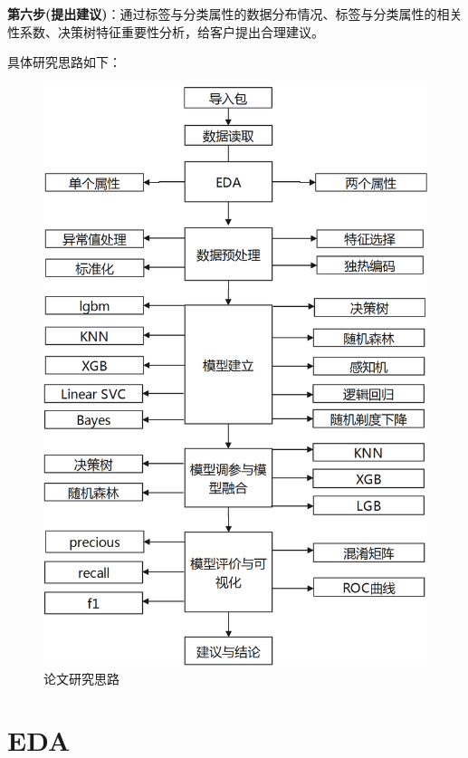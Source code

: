 \textbf{第六步(提出建议)}：通过标签与分类属性的数据分布情况、标签与分类属性的相关性系数、决策树特征重要性分析，给客户提出合理建议。


具体研究思路如下：
\begin{figure}[H]
	\centering
	\includegraphics[scale=0.65,angle=0]{images/1.png}
	\caption{论文研究思路}
	\label{1}
\end{figure}


\section{EDA}
